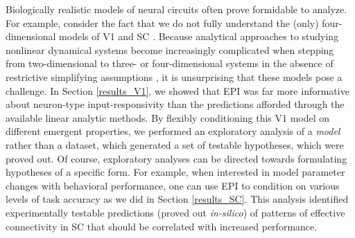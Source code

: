 \documentclass[11pt]{article}
\begin{document}
Biologically realistic models of neural circuits often prove formidable to analyze.
For example, consider the fact that we do not fully understand the (only) four-dimensional models of V1 \cite{litwin2016inhibitory} and SC \cite{duan2018collicular}.
Because analytical approaches to studying nonlinear dynamical systems become increasingly complicated when stepping from two-dimensional to three- or four-dimensional systems in the absence of restrictive simplifying assumptions \cite{strogatz1994nonlinear}, it is unsurprising that these models pose a challenge. 
In Section \ref{results_V1}, we showed that EPI was far more informative about neuron-type input-responsivity than the predictions afforded through the available linear analytic methods.
By flexibly conditioning this V1 model on different emergent properties, we performed an exploratory analysis of a \emph{model} rather than a dataset, which generated a set of testable hypotheses, which were proved out. 
Of course, exploratory analyses can be directed towards formulating hypotheses of a specific form.  For example,  when interested in model parameter changes with behavioral performance, one can use EPI to condition on various levels of task accuracy as we did in Section \ref{results_SC}.
This analysis identified experimentally testable predictions (proved out \textit{in-silico}) of patterns of effective connectivity in SC that should be correlated with increased performance.

\end{document}
